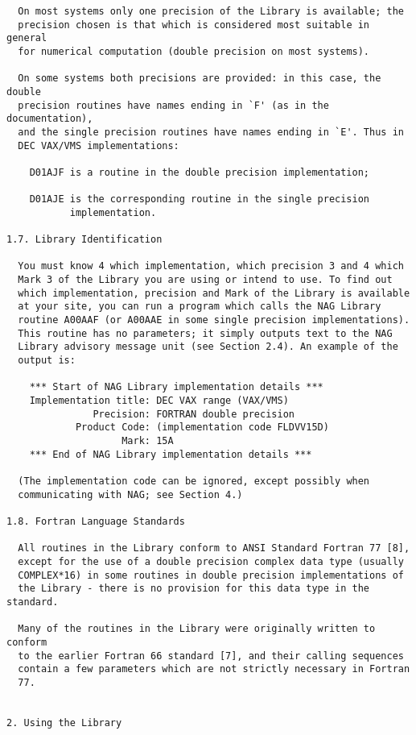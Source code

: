 \begin{verbatim}
  On most systems only one precision of the Library is available; the
  precision chosen is that which is considered most suitable in general
  for numerical computation (double precision on most systems).
 
  On some systems both precisions are provided: in this case, the double
  precision routines have names ending in `F' (as in the documentation),
  and the single precision routines have names ending in `E'. Thus in
  DEC VAX/VMS implementations:
 
    D01AJF is a routine in the double precision implementation;
 
    D01AJE is the corresponding routine in the single precision
           implementation.
 
1.7. Library Identification
 
  You must know 4 which implementation, which precision 3 and 4 which
  Mark 3 of the Library you are using or intend to use. To find out
  which implementation, precision and Mark of the Library is available
  at your site, you can run a program which calls the NAG Library
  routine A00AAF (or A00AAE in some single precision implementations).
  This routine has no parameters; it simply outputs text to the NAG
  Library advisory message unit (see Section 2.4). An example of the
  output is:
 
    *** Start of NAG Library implementation details ***
    Implementation title: DEC VAX range (VAX/VMS)
               Precision: FORTRAN double precision
            Product Code: (implementation code FLDVV15D)
                    Mark: 15A
    *** End of NAG Library implementation details ***
 
  (The implementation code can be ignored, except possibly when
  communicating with NAG; see Section 4.)
 
1.8. Fortran Language Standards
 
  All routines in the Library conform to ANSI Standard Fortran 77 [8],
  except for the use of a double precision complex data type (usually
  COMPLEX*16) in some routines in double precision implementations of
  the Library - there is no provision for this data type in the standard.
 
  Many of the routines in the Library were originally written to conform
  to the earlier Fortran 66 standard [7], and their calling sequences
  contain a few parameters which are not strictly necessary in Fortran
  77.
 
 
2. Using the Library
 

\end{verbatim}
